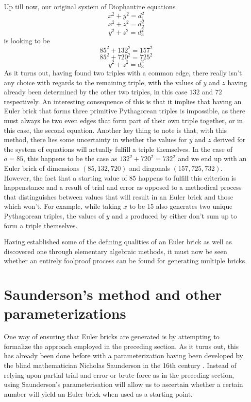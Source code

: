 \documentclass[11pt]{article}
\begin{document}
Up till now, our original system of Diophantine equations
$$x^2+y^2=d_1^2$$
$$x^2+z^2=d_2^2$$
$$y^2+z^2=d_3^2$$
is looking to be
$$85^2+132^2=157^2$$
$$85^2+720^2=725^2$$
$$y^2+z^2=d_3^2$$
As it turns out, having found two triples with a common edge, there really isn't any choice with regards to the remaining triple, with the values of $y$ and $z$ having already been determined by the other two triples, in this case $132$ and $72$ respectively. An interesting consequence of this is that it implies that having an Euler brick that forms three primitive Pythagorean triples is impossible, as there must always be two even edges that form part of their own triple together, or in this case, the second equation. Another key thing to note is that, with this method, there lies some uncertainty in whether the values for $y$ and $z$ derived for the system of equations will actually fulfill a triple themselves. In the case of $a=85$, this happens to be the case as $132^2+720^2=732^2$ and we end up with an Euler brick of dimensions $(85, 132, 720)$ and diagonals $(157, 725, 732)$. However, the fact that a starting value of $85$ happens to fulfill this criterion is happenstance and a result of trial and error as opposed to a methodical process that distinguishes between values that will result in an Euler brick and those which won't. For example, while taking $x$ to be $15$ also generates two unique Pythagorean triples, the values of $y$ and $z$ produced by either don't sum up to form a triple themselves. 

Having established some of the defining qualities of an Euler brick as well as discovered one through elementary algebraic methods, it must now be seen whether an entirely foolproof process can be found for generating multiple bricks.
\section{Saunderson's method and other parameterizations}
One way of ensuring that Euler bricks are generated is by attempting to formalize the approach employed in the preceding section. As it turns out, this has already been done before with a parameterization having been developed by the blind mathematician Nicholas Saunderson in the 16th century \cite[p. 429-431]{saunderson}. Instead of relying upon partial trial and error or brute-force as in the preceding section, using Saunderson's parameterisation will allow us to ascertain whether a certain number will yield an Euler brick when used as a starting point.
\end{document}
